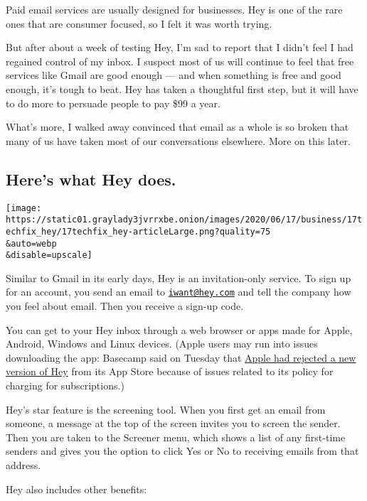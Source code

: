 Paid email services are usually designed for businesses. Hey is one of
the rare ones that are consumer focused, so I felt it was worth trying.

But after about a week of testing Hey, I'm sad to report that I didn't
feel I had regained control of my inbox. I suspect most of us will
continue to feel that free services like Gmail are good enough --- and
when something is free and good enough, it's tough to beat. Hey has
taken a thoughtful first step, but it will have to do more to persuade
people to pay \$99 a year.

What's more, I walked away convinced that email as a whole is so broken
that many of us have taken most of our conversations elsewhere. More on
this later.

\hypertarget{heres-what-hey-does}{%
\subsection{Here's what Hey does.}\label{heres-what-hey-does}}

\texttt{[image: https://static01.graylady3jvrrxbe.onion/images/2020/06/17/business/17techfix\_hey/17techfix\_hey-articleLarge.png?quality=75\\\&auto=webp\\\&disable=upscale]}

Similar to Gmail in its early days, Hey is an invitation-only service.
To sign up for an account, you send an email to
\href{mailto:iwant@hey.com}{\nolinkurl{iwant@hey.com}} and tell the
company how you feel about email. Then you receive a sign-up code.

You can get to your Hey inbox through a web browser or apps made for
Apple, Android, Windows and Linux devices. (Apple users may run into
issues downloading the app: Basecamp said on Tuesday that
\href{https://twitter.com/dhh/status/1272968382329942017}{Apple had
rejected a new version of Hey} from its App Store because of issues
related to its policy for charging for subscriptions.)

Hey's star feature is the screening tool. When you first get an email
from someone, a message at the top of the screen invites you to screen
the sender. Then you are taken to the Screener menu, which shows a list
of any first-time senders and gives you the option to click Yes or No to
receiving emails from that address.

Hey also includes other benefits:

